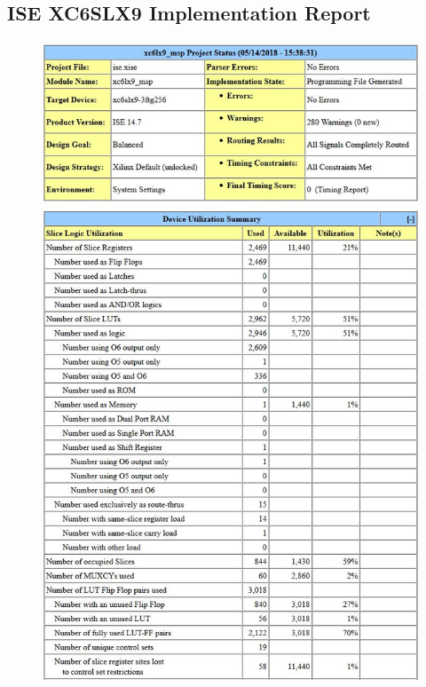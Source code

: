\documentclass[11pt,a4paper]{report}
\begin{document}
\newpage
\subsection{ISE XC6SLX9 Implementation Report}
\label{ise_report}
\begin{figure}[H]
    \begin{minipage}{0.5\textwidth}
        \centering
\includegraphics[scale=0.43]{ise1}

\end{minipage}
\end{figure}
\end{document}
